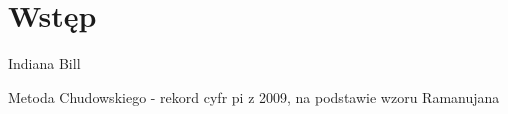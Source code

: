 \documentclass[11pt, wide, leqno]{mwart}
\begin{document}
\maketitle
\tableofcontents

\section{Wstęp}\label{sec:ws}

Indiana Bill

Metoda Chudowskiego - rekord cyfr pi z 2009, na podstawie wzoru Ramanujana








\end{document}
